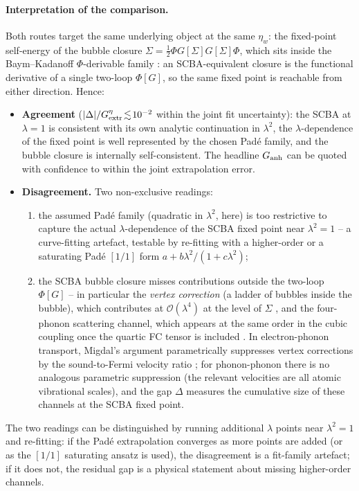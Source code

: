 \paragraph{Interpretation of the comparison.}
Both routes target the same underlying object at the same $\eta_{w}$:
the fixed-point self-energy of the bubble closure
$\Sigma=\frac{1}{2}\Phi G[\Sigma] G[\Sigma]\Phi$, which sits inside the
Baym--Kadanoff \(\Phi\)-derivable family
\cite{dahlen_LW_2006}: an
SCBA-equivalent closure is the functional derivative of a single
two-loop $\Phi[G]$, so the same fixed point is reachable from
either direction. Hence:
\begin{itemize}
\item \textbf{Agreement} ($|\Delta|/G^{\eta}_{\rm extr}\!\lesssim\!10^{-2}$
within the joint fit uncertainty): the SCBA at $\lambda\!=\!1$ is
consistent with its own analytic continuation in $\lambda^{2}$, the
$\lambda$-dependence of the fixed point is well represented by the
chosen Pad\'e family, and the bubble closure is internally
self-consistent. The headline $G_{\rm anh}$ can be quoted with
confidence to within the joint extrapolation error.
\item \textbf{Disagreement.} Two non-exclusive readings:
\begin{enumerate}
\item the assumed Pad\'e family (quadratic in $\lambda^{2}$, here)
is too restrictive to capture the actual $\lambda$-dependence of the
SCBA fixed point near $\lambda^{2}\!=\!1$ -- a curve-fitting
artefact, testable by re-fitting with a higher-order or a
saturating Pad\'e $[1/1]$ form $a+b\lambda^{2}/(1+c\lambda^{2})$;
\item the SCBA bubble closure misses contributions outside the
two-loop $\Phi[G]$ -- in particular the \emph{vertex correction}
(a ladder of bubbles inside the bubble), which contributes at
$\mathcal{O}(\lambda^{4})$ at the level of $\Sigma$
\cite{mera_inelastic_2012}, and the four-phonon scattering
channel, which appears at the same order in the cubic coupling once
the quartic FC tensor is included
\cite{han_fourphonon_2021}. In electron-phonon transport,
Migdal's argument parametrically suppresses vertex corrections by
the sound-to-Fermi velocity ratio
\cite{roy_migdal_2014}; for phonon-phonon there is no analogous
parametric suppression (the relevant velocities are all atomic
vibrational scales), and the gap $\Delta$ measures the cumulative
size of these channels at the SCBA fixed point.
\end{enumerate}
\end{itemize}
The two readings can be distinguished by running additional $\lambda$
points near $\lambda^{2}\!=\!1$ and re-fitting: if the Pad\'e
extrapolation converges as more points are added (or as the
$[1/1]$ saturating ansatz is used), the disagreement is a fit-family
artefact; if it does not, the residual gap is a physical statement
about missing higher-order channels.


